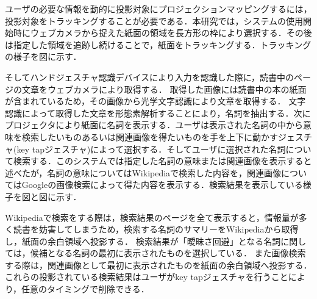 ユーザの必要な情報を動的に投影対象にプロジェクションマッピングするには，投影対象をトラッキングすることが必要である．本研究では，システムの使用開始時にウェブカメラから捉えた紙面の領域を長方形の枠により選択する．その後は指定した領域を追跡し続けることで，紙面をトラッキングする．トラッキングの様子を図に示す．


そしてハンドジェスチャ認識デバイスにより入力を認識した際に，読書中のページの文章をウェブカメラにより取得する．
取得した画像には読書中の本の紙面が含まれているため，その画像から光学文字認識により文章を取得する．
文字認識によって取得した文章を形態素解析することにより，名詞を抽出する．次にプロジェクタにより紙面に名詞を表示する．ユーザは表示された名詞の中から意味を検索したいものあるいは関連画像を得たいものを手を上下に動かすジェスチャ(key tapジェスチャ)によって選択する．そしてユーザに選択された名詞について検索する．このシステムでは指定した名詞の意味または関連画像を表示すると述べたが，名詞の意味についてはWikipedia\cite{wikipedia}で検索した内容を，関連画像についてはGoogleの画像検索によって得た内容を表示する．検索結果を表示している様子を図と図に示す．


Wikipediaで検索をする際は，検索結果のページを全て表示すると，情報量が多く読書を妨害してしまうため，検索する名詞のサマリーをWikipediaから取得し，紙面の余白領域へ投影する．
検索結果が「曖昧さ回避」となる名詞に関しては，候補となる名詞の最初に表示されたものを選択している．
また画像検索する際は，関連画像として最初に表示されたものを紙面の余白領域へ投影する．
これらの投影されている検索結果はユーザがkey tapジェスチャを行うことにより，任意のタイミングで削除できる．




